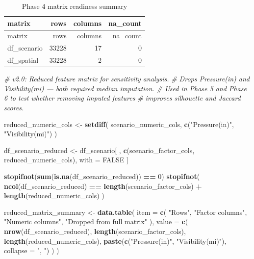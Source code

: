 \documentclass[
]{article}
\newenvironment{Shaded}{\begin{snugshade}}{\end{snugshade}}
\newcommand{\AttributeTok}[1]{\textcolor[rgb]{0.13,0.29,0.53}{#1}}
\newcommand{\CommentTok}[1]{\textcolor[rgb]{0.56,0.35,0.01}{\textit{#1}}}
\newcommand{\ConstantTok}[1]{\textcolor[rgb]{0.56,0.35,0.01}{#1}}
\newcommand{\DecValTok}[1]{\textcolor[rgb]{0.00,0.00,0.81}{#1}}
\newcommand{\FunctionTok}[1]{\textcolor[rgb]{0.13,0.29,0.53}{\textbf{#1}}}
\newcommand{\NormalTok}[1]{#1}
\newcommand{\OtherTok}[1]{\textcolor[rgb]{0.56,0.35,0.01}{#1}}
\newcommand{\SpecialCharTok}[1]{\textcolor[rgb]{0.81,0.36,0.00}{\textbf{#1}}}
\newcommand{\StringTok}[1]{\textcolor[rgb]{0.31,0.60,0.02}{#1}}
\begin{document}
\begin{longtable}[]{@{}lrrr@{}}
\caption{Phase 4 matrix readiness summary}\tabularnewline
\toprule\noalign{}
matrix & rows & columns & na\_count \\
\midrule\noalign{}
\endfirsthead
\toprule\noalign{}
matrix & rows & columns & na\_count \\
\midrule\noalign{}
\endhead
\bottomrule\noalign{}
\endlastfoot
df\_scenario & 33228 & 17 & 0 \\
df\_spatial & 33228 & 2 & 0 \\
\end{longtable}

\begin{Shaded}
\begin{Highlighting}[]
\CommentTok{\# v2.0: Reduced feature matrix for sensitivity analysis.}
\CommentTok{\# Drops Pressure(in) and Visibility(mi) — both required median imputation.}
\CommentTok{\# Used in Phase 5 and Phase 6 to test whether removing imputed features}
\CommentTok{\# improves silhouette and Jaccard scores.}

\NormalTok{reduced\_numeric\_cols }\OtherTok{\textless{}{-}} \FunctionTok{setdiff}\NormalTok{(}
\NormalTok{  scenario\_numeric\_cols,}
  \FunctionTok{c}\NormalTok{(}\StringTok{"Pressure(in)"}\NormalTok{, }\StringTok{"Visibility(mi)"}\NormalTok{)}
\NormalTok{)}

\NormalTok{df\_scenario\_reduced }\OtherTok{\textless{}{-}}\NormalTok{ df\_scenario[}
\NormalTok{  , }\FunctionTok{c}\NormalTok{(scenario\_factor\_cols, reduced\_numeric\_cols), with }\OtherTok{=} \ConstantTok{FALSE}
\NormalTok{]}

\FunctionTok{stopifnot}\NormalTok{(}\FunctionTok{sum}\NormalTok{(}\FunctionTok{is.na}\NormalTok{(df\_scenario\_reduced)) }\SpecialCharTok{==} \DecValTok{0}\NormalTok{)}
\FunctionTok{stopifnot}\NormalTok{(}
  \FunctionTok{ncol}\NormalTok{(df\_scenario\_reduced) }\SpecialCharTok{==}
    \FunctionTok{length}\NormalTok{(scenario\_factor\_cols) }\SpecialCharTok{+} \FunctionTok{length}\NormalTok{(reduced\_numeric\_cols)}
\NormalTok{)}

\NormalTok{reduced\_matrix\_summary }\OtherTok{\textless{}{-}} \FunctionTok{data.table}\NormalTok{(}
  \AttributeTok{item =} \FunctionTok{c}\NormalTok{(}
    \StringTok{"Rows"}\NormalTok{,}
    \StringTok{"Factor columns"}\NormalTok{,}
    \StringTok{"Numeric columns"}\NormalTok{,}
    \StringTok{"Dropped from full matrix"}
\NormalTok{  ),}
  \AttributeTok{value =} \FunctionTok{c}\NormalTok{(}
    \FunctionTok{nrow}\NormalTok{(df\_scenario\_reduced),}
    \FunctionTok{length}\NormalTok{(scenario\_factor\_cols),}
    \FunctionTok{length}\NormalTok{(reduced\_numeric\_cols),}
    \FunctionTok{paste}\NormalTok{(}\FunctionTok{c}\NormalTok{(}\StringTok{"Pressure(in)"}\NormalTok{, }\StringTok{"Visibility(mi)"}\NormalTok{), }\AttributeTok{collapse =} \StringTok{", "}\NormalTok{)}
\NormalTok{  )}
\NormalTok{)}


\end{Highlighting}
\end{Shaded}
\end{document}
